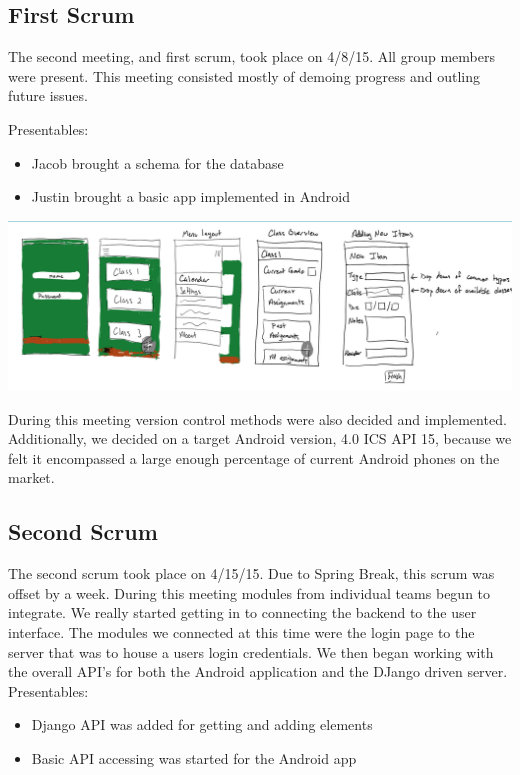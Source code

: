 \documentclass[a4paper]{article} %
\begin{document}
\subsection{First Scrum}

The second meeting, and first scrum, took place on 4/8/15. All group members were present. This meeting consisted mostly of demoing progress and outling future issues.

Presentables:
\begin{itemize}
  \item Jacob brought a schema for the database
    \item Justin brought a basic app implemented in Android
\end{itemize}
%
%

\centerline{\includegraphics[scale=.75]{Picture1.png}}

During this meeting version control methods were also decided and implemented. Additionally, we decided on a target Android version, 4.0 ICS API 15, because we felt it encompassed a large enough percentage of current Android phones on the market. \\

\subsection{Second Scrum}

The second scrum took place on 4/15/15. Due to Spring Break, this scrum was offset by a week. During this meeting modules from individual teams begun to integrate. We really started getting in to connecting the backend to the user interface. The modules we connected at this time were the login page to the server that was to house a users login credentials. We then began working with the overall API's for both the Android application and the DJango driven server. \\

Presentables:
\begin{itemize}
  \item Django API was added for getting and adding elements
    \item Basic API accessing was started for the Android app
\end{itemize}
\end{document}
